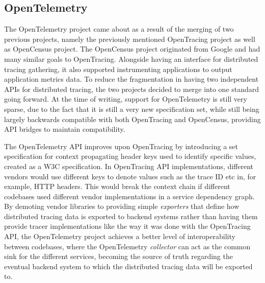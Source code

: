 \documentclass[12pt,pdftex,titlepage]{report}
\begin{document}
            \subsection{OpenTelemetry}
                The OpenTelemetry\cite{opentelemetry} project came about as a result of the merging of two previous projects, namely the previously mentioned OpenTracing
                project as well as OpenCensus project. The OpenCensus project originated from Google and had many similar goals to OpenTracing. Alongside having an interface
                for distributed tracing gathering, it also supported instrumenting applications to output application metrics data. To reduce the fragmentation in having
                two independent APIs for distributed tracing, the two projects decided to merge into one standard going forward. At the time of writing, support for OpenTelemetry
                is still very sparse, due to the fact that it is still a very new specification set, while still being largely backwards compatible with both OpenTracing and 
                OpenCensus, providing API bridges to maintain compatibility. 

                The OpenTelemetry API improves upon OpenTracing by introducing a set specification for context propagating header keys used to identify specific values, created
                as a W3C specification. In OpenTracing API implementations, different vendors would use different keys to denote values such as the trace ID etc in, for example, 
                HTTP headers. This would break the context chain if different codebases used different vendor implementations in a service dependency graph. By demoting vendor
                libraries to providing simple \textit{exporters} that define how distributed tracing data is exported to backend systems rather than having them provide
                tracer implementations like the way it was done with the OpenTracing API, the OpenTelemetry project achieves a better level of interoperability between codebases, 
                where the OpenTelemetry \textit{collector} can act as the common sink for the different services, becoming the source of truth regarding the eventual backend system
                to which the distributed tracing data will be exported to.
\end{document}
